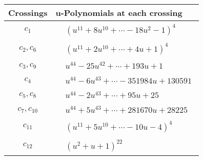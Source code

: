 \documentclass[1p]{elsarticle_modified}
\theoremstyle{definition}
\begin{document}
\begin{tabular}{m{50pt}|m{274pt}}
Crossings & \hspace{64pt}u-Polynomials at each crossing \\
\hline $$\begin{aligned}c_{1}\end{aligned}$$&$\begin{aligned}
&(u^{11}+8 u^{10}+\cdots-18 u^2-1)^{4}
\end{aligned}$\\
\hline $$\begin{aligned}c_{2},c_{6}\end{aligned}$$&$\begin{aligned}
&(u^{11}+2 u^{10}+\cdots+4 u+1)^{4}
\end{aligned}$\\
\hline $$\begin{aligned}c_{3},c_{9}\end{aligned}$$&$\begin{aligned}
&u^{44}-25 u^{42}+\cdots+193 u+1
\end{aligned}$\\
\hline $$\begin{aligned}c_{4}\end{aligned}$$&$\begin{aligned}
&u^{44}-6 u^{43}+\cdots-351984 u+130591
\end{aligned}$\\
\hline $$\begin{aligned}c_{5},c_{8}\end{aligned}$$&$\begin{aligned}
&u^{44}-2 u^{43}+\cdots+95 u+25
\end{aligned}$\\
\hline $$\begin{aligned}c_{7},c_{10}\end{aligned}$$&$\begin{aligned}
&u^{44}+5 u^{43}+\cdots+281670 u+28225
\end{aligned}$\\
\hline $$\begin{aligned}c_{11}\end{aligned}$$&$\begin{aligned}
&(u^{11}+5 u^{10}+\cdots-10 u-4)^{4}
\end{aligned}$\\
\hline $$\begin{aligned}c_{12}\end{aligned}$$&$\begin{aligned}
&(u^2+u+1)^{22}
\end{aligned}$\\
\hline
\end{tabular}\\~\\
\end{document}
